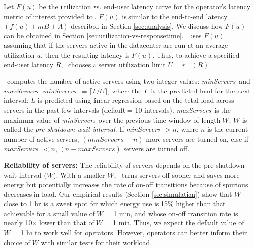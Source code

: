 \newcommand{\minServers}{\textit{minServers}}
\newcommand{\maxServers}{\textit{maxServers}}

Let $F(u)$ be the utilization vs. end-user latency curve for the operator's latency metric of interest provided to \shrink. $F(u)$ is similar to the end-to-end latency $(f(u) + mB + A)$ described in Section \ref{sec:analysis}. We discuss how $F(u)$ can be obtained in Section \ref{sec:utilization-vs-responsetime}.  \shrink\ uses $F(u)$ assuming that if the servers active in the datacenter are run at an average utilization $u$, then the resulting latency is $F(u)$. Thus, to achieve a specified end-user latency $R$, \shrink\ chooses a server utilization limit $U = r^{-1}(R)$.


\shrink\ computes the number of active servers using two integer values: \minServers\ and \maxServers. \minServers\ $= \lceil L/U \rceil$, where the $L$ is the predicted load for the next interval; $L$ is predicted using linear regression based on the total load across servers in the past few intervals (default = 10 intervals). \maxServers\ is the maximum value of \minServers\ over the previous time window of length $W$; $W$ is called the \emph{pre-shutdown wait interval}. If \minServers\ $ > n$, where $n$ is the current number of active servers, $(\minServers\ - n)$ more servers are turned on, else if  \maxServers\ $ < n$,  $(n - \maxServers)$ servers are turned off.  



\textbf{Reliability of servers:} The reliability of servers depends on the pre-shutdown wait interval ($W$). With a smaller $W$, \shrink\  turns servers off sooner and saves more energy but potentially increases the rate of on-off transitions because of spurious decreases in load.   Our empirical results (Section \ref{sec:simulation})  show that $W$ close to 1 hr is a sweet spot for which energy use is 15\% higher than that achievable for a small value of $W$ = 1 min, and whose on-off transition rate is  nearly 10$\times$ lower than that of $W$ = 1 min. Thus, we expect the default value of $W$ = 1 hr to work well for operators. However, operators can better inform their choice of $W$ with similar tests for their workload.

